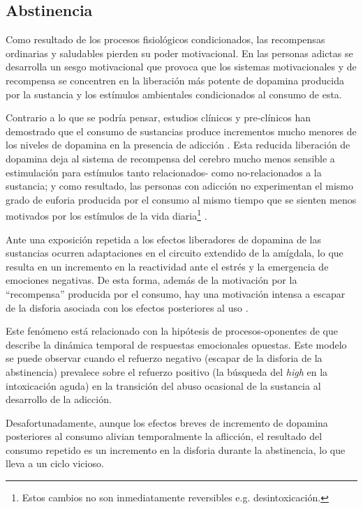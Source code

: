 \subsection{Abstinencia}
\label{abst}
Como resultado de los procesos fisiológicos condicionados, las recompensas ordinarias y saludables pierden su poder motivacional.
En las personas adictas se desarrolla un sesgo motivacional que provoca que los sistemas motivacionales y de recompensa se concentren en la liberación más potente de dopamina producida por la sustancia \textemdash{} y los estímulos ambientales condicionados al consumo de esta\parencite{Volkow2016}.\par
Contrario a lo que se podría pensar, estudios clínicos y pre-clínicos han demostrado que el consumo de sustancias produce incrementos mucho menores de los niveles de dopamina en la presencia de adicción \parencite{Volkow1997,Zhang2013,Volkow2014}.
Esta reducida liberación de dopamina deja al sistema de recompensa del cerebro mucho menos sensible a estimulación para estímulos tanto relacionados- como no-relacionados a la sustancia; y como resultado, las personas con adicción no experimentan el mismo grado de euforia producida por el consumo al mismo tiempo que se sienten menos motivados por los estímulos de la vida diaria\footnote{Estos cambios no son inmediatamente reversibles e.g. desintoxicación.} \parencite{Volkow2016}.\par
Ante una exposición repetida a los efectos liberadores de dopamina de las sustancias ocurren adaptaciones en el circuito extendido de la amígdala, lo que resulta en un incremento en la reactividad ante el estrés y la emergencia de emociones negativas.
De esta forma, además de la motivación por la ``recompensa'' producida por el consumo, hay una motivación intensa a escapar de la disforia asociada con los efectos posteriores al uso \parencite{Goldstein2012a,Volkow2016}.\par
Este fenómeno está relacionado con la hipótesis de procesos-oponentes de \textcite{Solomon1978} que describe la dinámica temporal de respuestas emocionales opuestas.
Este modelo se puede observar cuando el refuerzo negativo (escapar de la disforia de la abstinencia) prevalece sobre el refuerzo positivo (la búsqueda del \textit{high} en la intoxicación aguda) en la transición del abuso ocasional de la sustancia al desarrollo de la adicción.\par
Desafortunadamente, aunque los efectos breves de incremento de dopamina posteriores al consumo alivian temporalmente la aflicción, el resultado del consumo repetido es un incremento en la disforia durante la abstinencia, lo que lleva a un ciclo vicioso.

